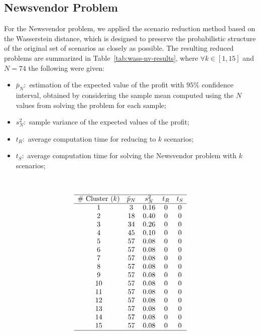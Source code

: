 \documentclass[a4paper,12pt]{article}
\begin{document}
	\subsection{Newsvendor Problem}
	
	For the Newsvendor problem, we applied the scenario reduction method based on the Wasserstein distance, which is designed to preserve the probabilistic structure of the original set of scenarios as closely as possible. The resulting reduced problems are summarized in Table~\ref{tab:wass-nv-results}, where $\forall k \in [1,15]$ and $N = 74$ the following were given:
	\begin{itemize}
		\item $\bar{p}_{N}:$ estimation of the expected value of the profit with $95\%$ confidence interval, obtained by considering the sample mean computed using the $N$ values from solving the problem for each sample; 
		\item $s^{2}_{N}:$ sample variance of the expected values of the profit;
		\item $t_{R}:$ average computation time for reducing to $k$ scenarios;
		\item $t_{S}:$ average computation time for solving the Newsvendor problem with $k$ scenarios;
	\end{itemize}~
	
	\[
	\begin{array}{ccccc}
		\hline
		\text{\# Cluster $(k)$} & \text{$\bar{p}_{N}$} & \text{$s_{N}^{2}$} & \text{$t_{R}$} & \text{$t_{S}$}\\
		\hline
		1 & 3 & 0.16 & 0 & 0\\
		2 & 18 & 0.40 & 0 & 0\\
		3 & 34 & 0.26 & 0 & 0\\
		4 & 45 & 0.10 & 0 & 0\\
		5 & 57 & 0.08 & 0 & 0\\
		6 & 57 & 0.08 & 0 & 0\\
		7 & 57 & 0.08 & 0 & 0\\
		8 & 57 & 0.08 & 0 & 0\\
		9 & 57 & 0.08 & 0 & 0\\
		10 & 57 & 0.08 & 0 & 0\\
		11 & 57 & 0.08 & 0 & 0\\
		12 & 57& 0.08 & 0 & 0\\
		13 & 57 & 0.08 & 0 & 0\\
		14 & 57 & 0.08 & 0 & 0\\
		15 & 57 & 0.08 & 0 & 0\\
		\hline
	\end{array}
	\]
	
\end{document}
